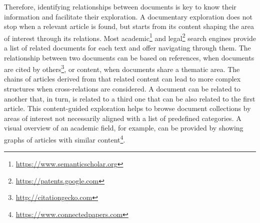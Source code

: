 Therefore, identifying relationships between documents is key to know their information and facilitate their exploration. A documentary exploration does not stop when a relevant article is found, but starts from its content shaping the area of interest through its relations. Most academic\footnote{\url{https://www.semanticscholar.org}} and legal\footnote{\url{https://patents.google.com}} search engines provide a list of related documents for each text and offer navigating through them. The relationship between two documents can be based on references, when documents are cited by others\footnote{\url{http://citationgecko.com}}, or content, when documents share a thematic area. The chains of articles derived from that related content can lead to more complex structures when cross-relations are considered. A document can be related to another that, in turn, is related to a third one that can be also related to the first article. This content-guided exploration helps to browse document collections by areas of interest not necessarily aligned with a list of predefined categories. A visual overview of an academic field, for example, can be provided by showing graphs of articles with similar content\footnote{\url{https://www.connectedpapers.com}}.

